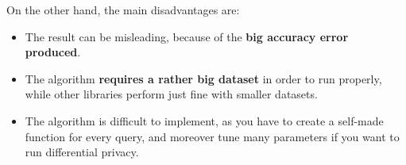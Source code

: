 On the other hand, the main disadvantages are:
\begin{itemize}
    \item The result can be misleading, because of the \textbf{big accuracy error produced}.
    \item The algorithm \textbf{requires a rather big dataset} in order to run properly, while other libraries perform just fine with smaller datasets.
    \item The algorithm is difficult to implement, as you have to create a self-made function for every query, and moreover tune many parameters if you want to run differential privacy.

\end{itemize}
